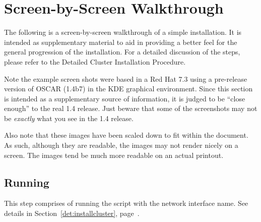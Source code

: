 %
%
%

\newpage

\section{Screen-by-Screen Walkthrough}
\label{app:screen-by-screen}

The following is a screen-by-screen walkthrough of a simple installation.
It is intended as supplementary material to aid in providing a better feel
for the general progression of the installation.  For a detailed discussion
of the steps, please refer to the Detailed Cluster Installation Procedure. 

Note the example screen shots were based in a Red Hat 7.3 using a
pre-release version of OSCAR (1.4b7) in the KDE graphical environment.
Since this section is intended as a supplementary source of
information, it is judged to be ``close enough'' to the real 1.4
release.  Just beware that some of the screenshots may not be {\em
  exactly} what you see in the 1.4 release.

Also note that these images have been scaled down to fit within the
document.  As such, although they are readable, the images may not
render nicely on a screen.  The images tend be much more readable on
an actual printout.



\subsection{Running }

This step comprises of running the  script with
the network interface name.  See details in
Section~\ref{det:installcluster}, page~\pageref{det:installcluster}.


